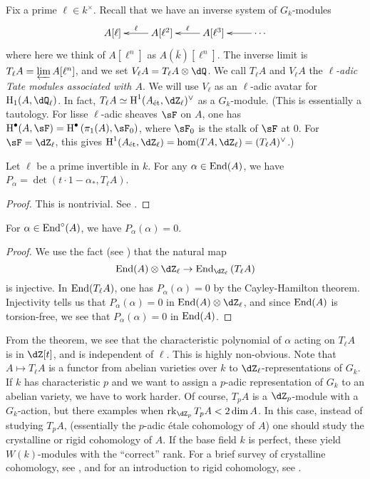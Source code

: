 \documentclass{article}
\begin{document}
Fix a prime $\ell\in k^\times$. Recall that we have an inverse system of 
$G_k$-modules 
\[\xymatrix{
  A[\ell] 
    & \ar[l]_-\ell A[\ell^2]
    & \ar[l]_-\ell A[\ell^3] 
    & \ar[l] \cdots
}\]
where here we think of $A[\ell^n]$ as $A(\bar k)[\ell^n]$. The inverse limit is 
$T_\ell A=\varprojlim A[\ell^n]$, and we set $V_\ell A=T_\ell A\otimes \dQ$. We 
call $T_\ell A$ and $V_\ell A$ the \emph{$\ell$-adic Tate modules associated with 
$A$}. We will use $V_\ell$ as an $\ell$-adic avatar for 
$\h_1(A,\dQ_\ell)$. In fact, $T_\ell A\simeq \h^1(\et A,\dZ_\ell)^\vee$ as a 
$G_k$-module. (This is essentially a tautology. For lisse $\ell$-adic sheaves 
$\sF$ on $A$, one has 
$\h^\bullet(A,\sF) = \h^\bullet\left(\pi_1(A),\sF_0\right)$, where $\sF_0$ is 
the stalk of $\sF$ at $0$. For $\sF=\dZ_\ell$, this gives 
$\h^1(\et A,\dZ_\ell) = \hom(T A,\dZ_\ell) = (T_\ell A)^\vee$.)

\begin{theorem}
Let $\ell$ be a prime invertible in $k$. For any $\alpha\in \operatorname{End}(A)$, we have 
$P_\alpha = \det(t\cdot 1-\alpha_\ast,T_\ell A)$. 
\end{theorem}
\begin{proof}
This is nontrivial. See \cite[I.10.20]{mi}. 
\end{proof}

\begin{corollary}
For $\alpha\in \operatorname{End}^\circ(A)$, we have $P_\alpha(\alpha)=0$. 
\end{corollary}
\begin{proof}
We use the fact (see \cite[I.10.15]{mi}) that the natural map 
\[
  \End(A)\otimes\dZ_\ell \to \End_{\dZ_\ell} \left(T_\ell A\right)
\]
is injective. In $\operatorname{End}(T_\ell A)$, one has $P_\alpha(\alpha)=0$ by the 
Cayley-Hamilton theorem. Injectivity tells us that 
$P_\alpha(\alpha)=0$ in $\End(A)\otimes\dZ_\ell$, and since $\operatorname{End}(A)$ is 
torsion-free, we see that $P_\alpha(\alpha)=0$ in $\operatorname{End}(A)$.
\end{proof}

From the theorem, we see that the characteristic polynomial of $\alpha$ acting 
on $T_\ell A$ is in $\dZ[t]$, and is independent of $\ell$. This is highly 
non-obvious. Note that $A\mapsto T_\ell A$ is a functor from abelian varieties 
over $k$ to $\dZ_\ell$-representations of $G_k$. If $k$ has characteristic $p$ 
and we want to assign a $p$-adic representation of $G_k$ to an abelian variety, 
we have to work harder. Of course, $T_p A$ is a $\dZ_p$-module with a 
$G_k$-action, but there examples when $\rank_{\dZ_p} T_p A < 2\dim A$. In this 
case, instead of studying $T_p A$, (essentially the $p$-adic \'etale cohomology 
of $A$) one should study the crystalline or rigid cohomology of $A$. If the 
base field $k$ is perfect, these yield $W(k)$-modules with the ``correct'' 
rank. For a brief survey of crystalline cohomology, see \cite{il94}, and for an  
introduction to rigid cohomology, see \cite{st07}. 












\end{document}
